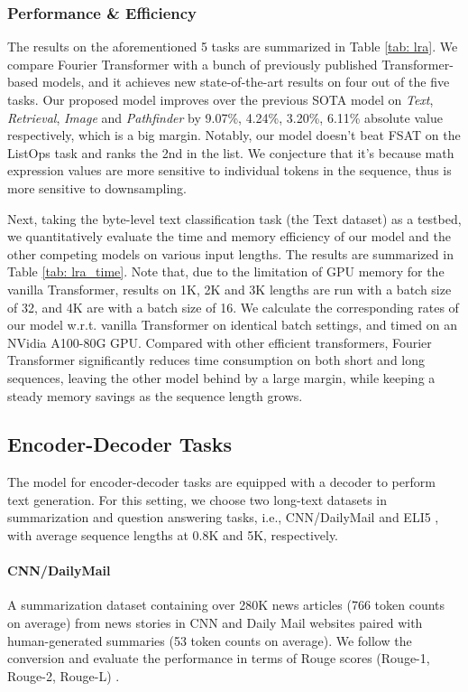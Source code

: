 \documentclass[11pt]{article}
\begin{document}
\subsubsection{Performance \& Efficiency}
The results on the aforementioned 5 tasks are summarized in Table \ref{tab: lra}. We compare Fourier Transformer with a bunch of previously published Transformer-based models, and it achieves new state-of-the-art results on four out of the five tasks. Our proposed model improves over the previous SOTA model \citep{zhuang2022long} on \textit{Text}, \textit{Retrieval}, \textit{Image} and \textit{Pathfinder} by 9.07\%, 4.24\%, 3.20\%, 6.11\% absolute value respectively, which is a big margin. Notably, our model doesn't beat FSAT \citep{zhuang2022long} on the ListOps task and ranks the 2nd in the list. We conjecture that it's because math expression values are more sensitive to individual tokens in the sequence, thus is more sensitive to downsampling. 

Next, taking the byte-level text classification task (the Text dataset) as a testbed, we quantitatively evaluate the time and memory efficiency of our model and the other competing models on various input lengths. The results are summarized in Table \ref{tab: lra_time}. Note that, due to the limitation of GPU memory for the vanilla Transformer, results on 1K, 2K and 3K lengths are run with a batch size of 32, and 4K are with a batch size of 16. We calculate the corresponding rates of our model w.r.t. vanilla Transformer on identical batch settings, and timed on an NVidia A100-80G GPU. Compared with other efficient transformers, Fourier Transformer significantly reduces time consumption on both short and long sequences, leaving the other model behind by a large margin, while keeping a steady memory savings as the sequence length grows.


\subsection{Encoder-Decoder Tasks}
The model for encoder-decoder tasks are equipped with a decoder to perform text generation. For this setting, we choose two long-text datasets in summarization and question answering tasks, i.e., CNN/DailyMail \citep{hermann2015teaching} and ELI5 \citep{eli5_lfqa}, with average sequence lengths at 0.8K and 5K, respectively.




\paragraph{CNN/DailyMail} A summarization dataset containing over 280K news articles (766 token counts on average) from news stories in CNN and Daily Mail websites paired with human-generated summaries (53 token counts on average). We follow the conversion and evaluate the performance in terms of Rouge scores (Rouge-1, Rouge-2, Rouge-L) \citep{lin2004rouge}.
\end{document}
